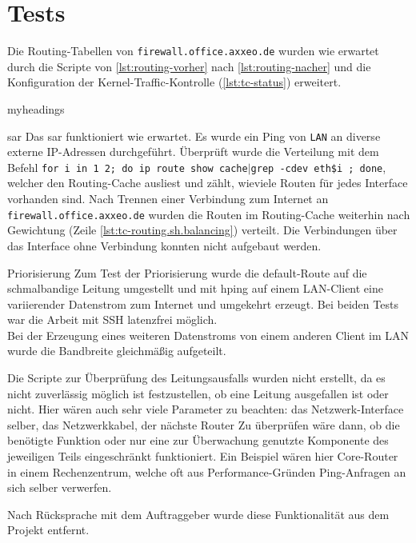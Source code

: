 \section{Tests}
Die Routing-Tabellen von \texttt{firewall.office.axxeo.de} wurden wie erwartet durch die Scripte von \vref{lst:routing-vorher} nach \ref{lst:routing-nacher} und die Konfiguration der Kernel-Traffic-Kontrolle (\ref{lst:tc-status}) erweitert.
\begin{labeling}[ -- ]{myheadings}
  \item[\gls{sar}]
    Das \gls{sar} funktioniert wie erwartet. Es wurde ein Ping von \texttt{LAN} an diverse externe \gls{IP}-Adressen durchgeführt. Überprüft wurde die Verteilung mit dem Befehl \texttt{for i in 1 2;  do ip route show cache$|$grep -c{\tq}dev eth\$i{\tq} ; done}, welcher den Routing-\gls{Cache} ausliest und zählt, wieviele Routen für jedes Interface vorhanden sind.
    Nach Trennen einer Verbindung zum Internet an \texttt{firewall.office.axxeo.de} wurden die Routen im Routing-Cache weiterhin nach Gewichtung (Zeile \vref{lst:tc-routing.sh.balancing}) verteilt. Die Verbindungen über das Interface ohne Verbindung konnten nicht aufgebaut werden.
  \item[Priorisierung]
    Zum Test der Priorisierung wurde die default-Route auf die schmalbandige Leitung umgestellt und mit \gls{hping} auf einem LAN-Client eine variierender Datenstrom zum Internet und umgekehrt erzeugt. Bei beiden Tests war die Arbeit mit SSH latenzfrei möglich.\\
    Bei der Erzeugung eines weiteren Datenstroms von einem anderen Client im LAN wurde die Bandbreite gleichmäßig aufgeteilt.
\end{labeling}
Die Scripte zur Überprüfung des Leitungsausfalls wurden nicht erstellt, da es nicht zuverlässig möglich ist festzustellen, ob eine Leitung ausgefallen ist oder nicht. Hier wären auch sehr viele Parameter zu beachten: {\ua}das Netzwerk-Interface selber, das Netzwerkkabel, der nächste Router {\etc}
Zu überprüfen wäre dann, ob die benötigte Funktion oder nur eine zur Überwachung genutzte Komponente des jeweiligen Teils eingeschränkt funktioniert. Ein Beispiel wären hier Core-Router in einem Rechenzentrum, welche oft aus Performance-Gründen Ping-Anfragen an sich selber verwerfen.

Nach Rücksprache mit dem Auftraggeber wurde diese Funktionalität aus dem Projekt entfernt.
